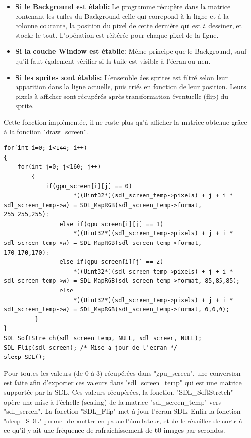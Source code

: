 \documentclass[french]{report}
\begin{document}
\begin{itemize}
\item \textbf{Si le Background est établi:}
	Le programme récupère dans la matrice contenant les tuiles du Background celle qui correpond à la ligne et à la colonne courante, la position du pixel de cette dernière qui est à dessiner, et stocke le tout. L'opération est réitérée pour chaque pixel de la ligne.
\item \textbf{Si la couche Window est établie:}
	Même principe que le Background, sauf qu'il faut également vérifier si la tuile est visible à l'écran ou non.
\item \textbf{Si les sprites sont établis:}
	L'ensemble des sprites est filtré selon leur apparition dans la ligne actuelle, puis triés en fonction de leur position. 
	Leurs pixels à afficher sont récupérés après transformation éventuelle (flip) du sprite.
\end{itemize}
Cette fonction implémentée, il ne reste plus qu'à afficher la matrice obtenue grâce à la fonction "draw\_screen". 

\begin{lstlisting}
for(int i=0; i<144; i++)
{
	for(int j=0; j<160; j++)
        {
        	if(gpu_screen[i][j] == 0)
                	*((Uint32*)(sdl_screen_temp->pixels) + j + i * sdl_screen_temp->w) = SDL_MapRGB(sdl_screen_temp->format, 255,255,255);
                else if(gpu_screen[i][j] == 1)
                	*((Uint32*)(sdl_screen_temp->pixels) + j + i * sdl_screen_temp->w) = SDL_MapRGB(sdl_screen_temp->format, 170,170,170);
                else if(gpu_screen[i][j] == 2)
                	*((Uint32*)(sdl_screen_temp->pixels) + j + i * sdl_screen_temp->w) = SDL_MapRGB(sdl_screen_temp->format, 85,85,85);
                else
                	*((Uint32*)(sdl_screen_temp->pixels) + j + i * sdl_screen_temp->w) = SDL_MapRGB(sdl_screen_temp->format, 0,0,0);
         }
}
SDL_SoftStretch(sdl_screen_temp, NULL, sdl_screen, NULL);
SDL_Flip(sdl_screen); /* Mise a jour de l'ecran */
sleep_SDL();
\end{lstlisting}
Pour toutes les valeurs (de 0 à 3) récupérées dans "gpu\_screen", une conversion est faite afin d'exporter ces valeurs dans "sdl\_screen\_temp" qui est une matrice supportée par la SDL. Ces valeurs récupérées, la fonction "SDL\_SoftStretch" opère une mise à l'échelle (scaling) de la matrice "sdl\_screen\_temp" vers "sdl\_screen". La fonction "SDL\_Flip" met à jour l'écran SDL. Enfin la fonction "sleep\_SDL" permet de mettre en pause l'émulateur, et de le réveiller de sorte à ce qu'il y ait une fréquence de rafraîchissement de 60 images par secondes.
\end{document}
